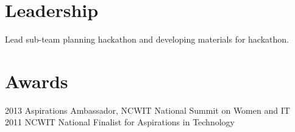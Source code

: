 \documentclass[]{deedy-resume-openfont}
\begin{document}
\begin{minipage}[t]{0.66\textwidth}





\section{Leadership} 
Lead sub-team planning hackathon and developing materials for hackathon.
\sectionsep



\section{Awards} 
2013	      Aspirations Ambassador, NCWIT National Summit on Women and IT\\
2011          NCWIT National Finalist for Aspirations in Technology
\sectionsep



\end{minipage} 
\end{document}
